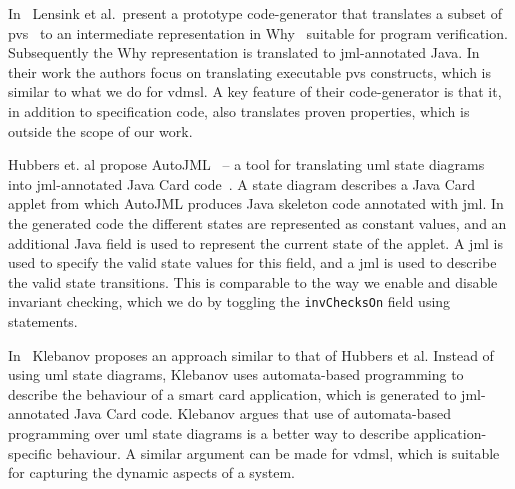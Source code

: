 In~\cite{Lensink&12} Lensink et al.\ present a prototype
code-generator that translates a subset of \ac{pvs}~\cite{Owre&92} to
an intermediate representation in Why~\cite{Filliatre03} suitable for
program verification. Subsequently the Why representation is
translated to \ac{jml}-annotated Java. In their work the authors focus
on translating executable \ac{pvs} constructs, which is similar to
what we do for \ac{vdmsl}. A key feature of their code-generator is
that it, in addition to specification code, also translates proven
properties, which is outside the scope of our work.

Hubbers et. al propose AutoJML~\cite{Hubbers&03a} -- a tool for
translating \ac{uml} state diagrams into \ac{jml}-annotated Java Card
code~\cite{Chen&00}. A state diagram describes a Java Card applet from
which AutoJML produces Java skeleton code annotated with \ac{jml}. In
the generated code the different states are represented as constant
values, and an additional Java field is used to represent the current
state of the applet. A \ac{jml}  is used to specify the
valid state values for this field, and a \ac{jml}  is
used to describe the valid state transitions. This is comparable to
the way we enable and disable invariant checking, which we do by
toggling the \texttt{invChecksOn}  field using 
statements.

In~\cite{Klebanov&08} Klebanov proposes an approach similar to that of
Hubbers et al. Instead of using \ac{uml} state diagrams, Klebanov uses
automata-based programming to describe the behaviour of a smart card
application, which is generated to \ac{jml}-annotated Java Card
code. Klebanov argues that use of automata-based programming over
\ac{uml} state diagrams is a better way to describe
application-specific behaviour. A similar argument can be made for
\ac{vdmsl}, which is suitable for capturing the dynamic aspects of a
system.


